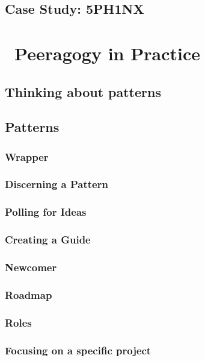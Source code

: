 \documentclass[ebook, 12pt, twoside]{memoir}
\begin{document}
\chapter[\textbf{Case Study: 5PH1NX}]{Case Study: 5PH1NX}\label{sphinx-beginning}
%


\part{~Peeragogy in Practice} \label{practice-part}  %
%
\chapter[\textbf{Thinking about patterns}]{Thinking about patterns}

%
\chapter[\textbf{Patterns}]{ Patterns }

\section*{Wrapper}

\section*{Discerning a Pattern}

\section*{Polling for Ideas}

\section*{Creating a Guide}

\section*{Newcomer}

\section*{Roadmap}

\section*{Roles}

\section*{Focusing on a specific project}

\end{document}
